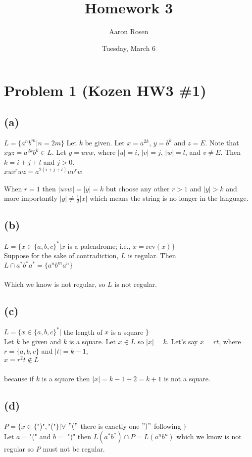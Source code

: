 \documentclass[11pt, a4paper, oneside]{article}
\begin{document}
\title{Homework 3}
\author{Aaron Rosen}
\date{Tuesday, March 6}
\maketitle

\section*{Problem 1 (Kozen HW3 \#1)}
\subsection*{(a)}
$L = \{ a^n b^m | n = 2m\}$
Let $k$ be given. Let $x = a^{2k}$, $y = b^k$ and $z = E$. 
	Note that $xyz = a^{2k} b^k \in L$. Let $y = uvw$, where $|u| = i$, $|v| = j$,
	$|w| = l$, and $v \neq E$. Then $k = i + j + l$ and $j > 0$. \\

$xuv^rwz = a^{2(i+j+l)}uv^rw$\\
\\
When $r = 1$ then $|uvw| = |y| = k$ but choose any other $r > 1$ and $|y| > k$ 
	and more importantly $|y| \neq \frac{1}{2}|x|$ which means the string is no
	longer in the language.
\subsection*{(b)}
$L = \{x \in \{a, b, c\}^* | x$ is a palendrome; i.e., $x = $rev$(x)\}$\\
Suppose for the sake of contradiction, $L$ is regular. Then \\

$L \cap a^* b^* a^* = \{a^n b^m a^n\}$\\
\\
Which we know is not regular, so $L$ is not regular.
\subsection*{(c)}
$L = \{x \in \{a, b, c\}^* | $ the length of $x$ is a square $\}$\\
Let $k$ be given and $k$ is a square. Let $x \in L$ so $|x| = k$. Let's 
	say $x=rt$, where $r = \{a, b, c\}$ and $|t| = k - 1$,\\

$x = r^2 t \notin L$\\
\\
because if $k$ is a square then $|x| = k - 1 + 2 = k + 1$ is not a square.
\subsection*{(d)}
$P = \{ x \in \{$")"$,$"("$\} | \forall$ $ "("$ there 
	is exactly one $")"$ following $\}$\\
Let $a = $"(" and $b = $ ")" then $L(a^* b^*) \cap P = L(a^n b^n)$ which we know
	is not regular so $P$ must not be regular.
\end{document}
